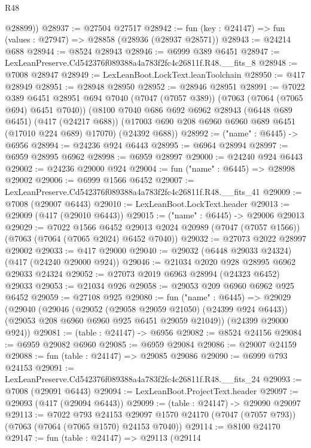 \begin{lexlean}{R48}
\begin{coremodule}
        @28899))
@28937 := @27504 @27517
@28942 := fun (key : @24147) => fun (values : @27947) => @28858 (@28936 (@28937 @28571))
@28943 := @24214 @688
@28944 := @8524 @28943
@28946 := @6999 @389 @6451
@28947 := LexLeanPreserve.Cd542376f089388a4a783f2fc4c26811f.R48.__fits_8
@28948 := @7008 @28947
@28949 := LexLeanBoot.LockText.leanToolchain
@28950 := @417 @28949
@28951 := @28948 @28950
@28952 := @28946 @28951
@28991 := @7022
    @389
    @6451
    @28951
    @694
    @7040
    (@7047 (@7057 @389))
    (@7063 (@7064 (@7065 @694) @6451 @7040))
    (@8100
      @7040
      @686
      @692
      @6962
      @28943
      (@6448 @689 @6451)
      (@417 (@24217 @688))
      (@17003 @690 @208 @6960 @6960 @689 @6451 (@17010 @224 @689) @17070)
      (@24392 @688))
@28992 := ("name" : @6445) -> @6956
@28994 := @24236 @924 @6443
@28995 := @6964 @28994
@28997 := @6959 @28995 @6962
@28998 := @6959 @28997
@29000 := @24240 @924 @6443
@29002 := @24236 @29000 @924
@29004 := fun ("name" : @6445) => @28998 @29002
@29006 := @6999 @1566 @6452
@29007 := LexLeanPreserve.Cd542376f089388a4a783f2fc4c26811f.R48.__fits_41
@29009 := @7008 (@29007 @6443)
@29010 := LexLeanBoot.LockText.header
@29013 := @29009 (@417 (@29010 @6443))
@29015 := ("name" : @6445) -> @29006 @29013
@29029 := @7022
    @1566
    @6452
    @29013
    @2024
    @20989
    (@7047 (@7057 @1566))
    (@7063 (@7064 (@7065 @2024) @6452 @7040))
@29032 := @27073 @2022 @28997 @29002
@29033 := @417 @29000
@29040 := @29032 (@6448 @29033 @24324) (@417 (@24240 @29000 @924))
@29046 := @21034 @2020 @928 @28995 @6962 @29033 @24324
@29052 := @27073 @2019 @6963 @28994 (@24323 @6452) @29033
@29053 := @21034 @926
@29058 := @29053 @209 @6960 @6962 @925 @6452
@29059 := @27108 @925
@29080 := fun ("name" : @6445) =>
  @29029
    (@29040
      (@29046
        (@29052 (@29058 @29059 @21050) (@24399 @924 @6443))
        (@29053 @208 @6960 @6960 @925 @6451 @29059 @21049))
      (@24399 @29000 @924))
@29081 := (table : @24147) -> @6956
@29082 := @8524 @24156
@29084 := @6959 @29082 @6960
@29085 := @6959 @29084
@29086 := @29007 @24159
@29088 := fun (table : @24147) => @29085 @29086
@29090 := @6999 @793 @24153
@29091 := LexLeanPreserve.Cd542376f089388a4a783f2fc4c26811f.R48.__fits_24
@29093 := @7008 (@29091 @6443)
@29094 := LexLeanBoot.ProjectText.header
@29097 := @29093 (@417 (@29094 @6443))
@29099 := (table : @24147) -> @29090 @29097
@29113 := @7022
    @793
    @24153
    @29097
    @1570
    @24170
    (@7047 (@7057 @793))
    (@7063 (@7064 (@7065 @1570) @24153 @7040))
@29114 := @8100 @24170
@29147 := fun (table : @24147) =>
  @29113
    (@29114

\end{coremodule}
\end{lexlean}
